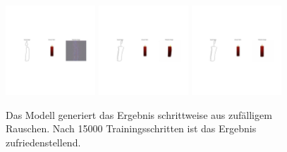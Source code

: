 \begin{figure}[h]
	\centering
	\includegraphics[width=0.3\textwidth]{bilder/0.jpg}
	\includegraphics[width=0.3\textwidth]{bilder/1.jpg}
	\includegraphics[width=0.3\textwidth]{bilder/15.jpg}
	\caption[step01]{Das Modell generiert das Ergebnis schrittweise aus zufälligem Rauschen. Nach 15000 Trainingsschritten ist das Ergebnis zufriedenstellend.}
	\label{fig:trichter}
\end{figure}


